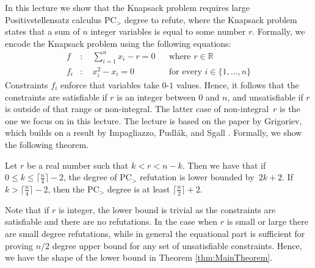 \documentclass[a4paper,twoside,justified]{tufte-handout}
\begin{document}
 

\newcommand{\pcsys}{\mathrm{PC}_{>}}

\newcommand{\ceil}[1]{\lceil{}#1\rceil{}}
\newcommand{\Ceil}[1]{\bigl\lceil{}#1\bigr\rceil{}}
\newcommand{\CEIL}[1]{\left\lceil{}#1\right\rceil{}}

In this lecture we show that the Knapsack problem requires large
Positivstellensatz calculus $\pcsys$ degree to refute, where the
Knapsack problem states that a sum of $n$ integer variables is equal
to some number $r$. Formally, we encode the Knapsack problem using the
following equations:
\begin{align*}
  f &\colon \quad \sum_{i = 1}^n x_i - r = 0 & &\text{where $r \in \mathbb{R}$} \\
  f_i &\colon \quad x_i^2 - x_i = 0 & &\text{for every $i \in \{1, \ldots, n\}$}
\end{align*}
Constraints $f_i$ enforce that variables take $0$-$1$ values. Hence,
it follows that the constraints are satisfiable if $r$ is an integer
between $0$ and $n$, and unsatisfiable if $r$ is outside of that range
or non-integral. The latter case of non-integral~$r$ is the one we
focus on in this lecture. The lecture is based on the paper by
Grigoriev, which builds on a result by Impagliazzo, Pudl\'{a}k, and
Sgall \cite{grigoriev2001knapsack,IPS99LowerBounds}. Formally, we show
the following theorem.

\begin{theorem}\label{thm:MainTheorem}
  Let $r$ be a real number such that $k < r < n - k$. Then we have
  that if $0 \leq k \leq \Ceil{\frac{n}{4}} - 2$, the degree of
  $\pcsys$ refutation is lower bounded by~$2 k + 2$. If $k >
  \Ceil{\frac{n}{4}} - 2$, then the $\pcsys$ degree is at least
  $\ceil{\frac{n}{2}} + 2$.
\end{theorem}

Note that if $r$ is integer, the lower bound is trivial as the
constraints are satisfiable and there are no refutations. In the case
when $r$ is small or large there are small degree refutations, while
in general the equational part is sufficient for proving $n / 2$
degree upper bound for any set of unsatisfiable constraints. Hence, we
have the shape of the lower bound in Theorem \ref{thm:MainTheorem}.
\end{document}
